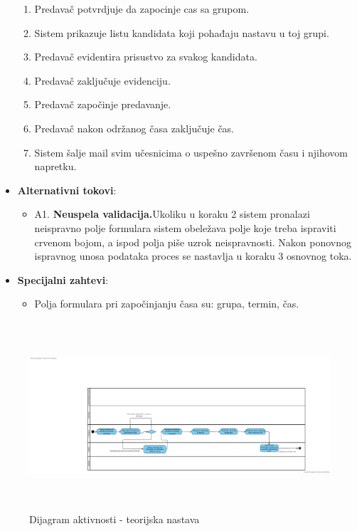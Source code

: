 \begin{itemize}
\begin{enumerate}
        \item Predavač potvrdjuje da zapocinje cas sa grupom.
        \item Sistem prikazuje listu kandidata koji pohađaju nastavu u toj grupi.
        \item Predavač evidentira prisustvo za svakog kandidata.
        \item Predavač zaključuje evidenciju.
        \item Predavač započinje predavanje.
        \item Predavač nakon održanog časa zaključuje čas.
        \item Sistem šalje mail svim učesnicima o uspešno završenom času i njihovom napretku. %
      \end{enumerate}

  \item \textbf{Alternativni tokovi}:
      \begin{itemize}
        \item A1. \textbf{Neuspela validacija.}Ukoliku u koraku 2 sistem pronalazi neispravno polje formulara sistem obeležava polje koje treba ispraviti 
        crvenom bojom, a ispod polja piše  uzrok neispravnosti. Nakon ponovnog ispravnog unosa podataka proces se nastavlja u koraku 3 osnovnog toka.
      \end{itemize}
      
 \item \textbf{Specijalni zahtevi}:
      \begin{itemize}
        \item Polja formulara pri započinjanju časa su: grupa, termin, čas.
      \end{itemize}
\end{itemize}

\begin{figure}[H]
  \begin{center}
      \includegraphics[width=140mm, height=70mm]{Diagrams/teorijska nastava dijagram.png}
  \end{center}
  \caption {Dijagram aktivnosti - teorijska nastava}
  \label{activity_diagram}

\end{figure}
